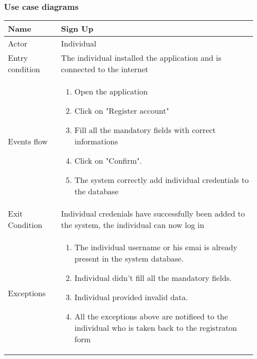 \subsubsection{Use case diagrams}



\begin{tabular}{|l|p{13cm}|}
    \hline
    Name & Sign Up
    \\ \hline
    Actor & Individual
    \\ \hline 
    Entry condition & The individual installed the application and is connected to the internet
    \\ \hline
    Events flow &
    \begin{enumerate}
    \item Open the application
    \item Click on "Register account"
    \item Fill all the mandatory fields with correct informations
    \item Click on "Confirm".
    \item The system correctly add individual credentials to the database
    \end{enumerate}
     \\ \hline
     Exit Condition & Individual credenials have successfully been added to the system,
     the individual can now log in     
     \\
    \hline
    Exceptions &
        \begin{enumerate}
    \item The individual username or his emai is already present in the system database.
    \item Individual didn't fill all the mandatory fields.
    \item Individual provided invalid data.
    \item All the exceptions above are notifieed to the individual who is taken back to the registraton form
    \end{enumerate}
      \\
    \hline
\end{tabular}



